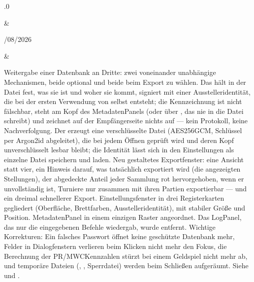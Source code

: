 \documentclass[letterpaper,10pt,german]{sphinxmanual}
\begin{document}
\begin{savenotes}
\begin{longtable}{}
\begin{varwidth}[t]{}
.0
\sphinxbeforeendvarwidth
\end{varwidth}%
&\begin{varwidth}[t]{}
/08/2026
\sphinxbeforeendvarwidth
\end{varwidth}%
&\begin{varwidth}[t]{}
\sphinxAtStartPar
Weitergabe einer Datenbank an Dritte: zwei voneinander unabhängige Mechanismen, beide optional und beide beim Export zu wählen. Das  hält in der Datei fest, was sie ist und woher sie kommt, signiert mit einer Ausstelleridentität, die bei der ersten Verwendung von selbst entsteht; die Kennzeichnung ist nicht fälschbar, steht am Kopf des Metadaten\sphinxhyphen{}Panels (oder über , das nie in die Datei schreibt) und zeichnet auf der Empfängerseite nichts auf — kein Protokoll, keine Nachverfolgung. Der  erzeugt eine verschlüsselte \sphinxhyphen{}Datei (AES\sphinxhyphen{}256\sphinxhyphen{}GCM, Schlüssel per Argon2id abgeleitet), die bei jedem Öffnen geprüft wird und deren Kopf unverschlüsselt lesbar bleibt; die Identität lässt sich in den Einstellungen als einzelne Datei speichern und laden. Neu gestaltetes Exportfenster: eine Ansicht statt vier, ein Hinweis darauf, was tatsächlich exportiert wird (die angezeigten Stellungen), der abgedeckte Anteil jeder Sammlung rot hervorgehoben, wenn er unvollständig ist, Turniere nur zusammen mit ihren Partien exportierbar — und ein dreimal schnellerer Export. Einstellungsfenster in drei Registerkarten gegliedert (Oberfläche, Brettfarben, Ausstelleridentität), mit stabiler Größe und Position. Metadaten\sphinxhyphen{}Panel in einem einzigen Raster angeordnet. Das Log\sphinxhyphen{}Panel, das nur die eingegebenen Befehle wiedergab, wurde entfernt. Wichtige Korrekturen: Ein falsches Passwort öffnet keine geschützte Datenbank mehr, Felder in Dialogfenstern verlieren beim Klicken nicht mehr den Fokus, die Berechnung der PR/MWC\sphinxhyphen{}Kennzahlen stürzt bei einem Geldspiel nicht mehr ab, und temporäre Dateien (, , Sperrdatei) werden beim Schließen aufgeräumt. Siehe {\hyperref[\detokenize{manuel:diffusion-controlee}]{}} und {\hyperref[\detokenize{manuel:manuel}]{}}.

\end{varwidth}
\end{longtable}
\end{savenotes}
\end{document}
